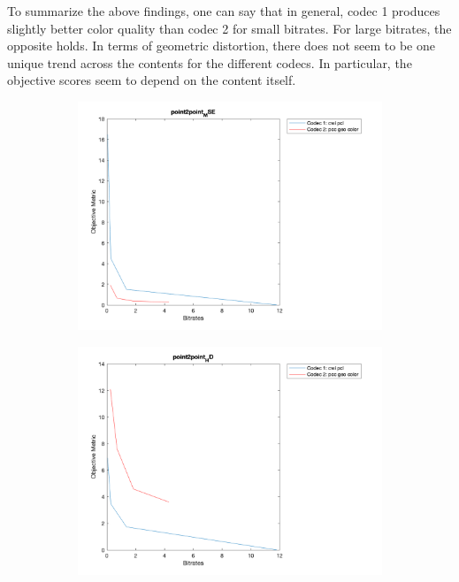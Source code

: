 \documentclass{article}
\begin{document}
 To summarize the above findings, one can say that in general, codec 1 produces slightly better color quality than codec 2 for small bitrates. For large bitrates, the opposite holds. In terms of geometric distortion, there does not seem to be one unique trend across the contents for the different codecs. In particular, the objective scores seem to depend on the content itself.  
\begin{figure}
    \centering
    \begin{subfigure}[b]{0.65\textwidth}
    \includegraphics[width=\textwidth]{Figures/task2/guanyin_p2p_mse.png}
    \end{subfigure}

    \begin{subfigure}[b]{0.65\textwidth}
    \includegraphics[width=\textwidth]{Figures/task2/guanyin_p2p_hd.png}
    \end{subfigure}


\end{figure}
\end{document}
